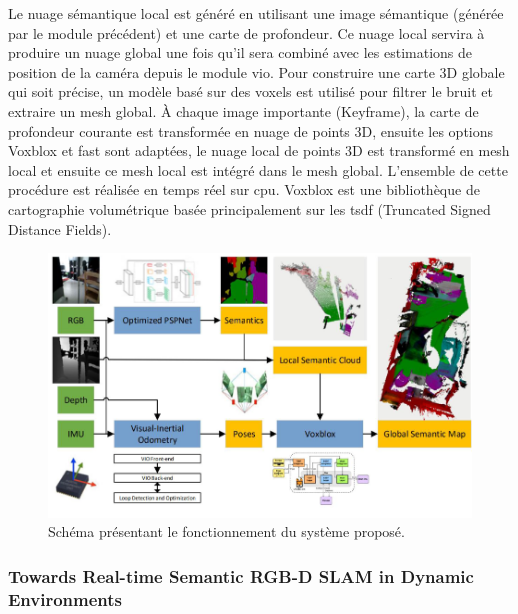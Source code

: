 \documentclass[11pt]{article}
\begin{document}
  Le nuage sémantique local est généré en utilisant une image sémantique (générée par le module précédent) et une carte de profondeur. 
  Ce nuage local servira à produire un nuage global une fois qu'il sera combiné avec les estimations de position de la caméra depuis le module \acrshort{vio}.
  Pour construire une carte 3D globale qui soit précise, un modèle basé sur des voxels est utilisé pour filtrer le bruit et extraire un mesh global.
  À chaque image importante (Keyframe), la carte de profondeur courante est transformée en nuage de points 3D, ensuite les options Voxblox et \acrshort{fast}
  sont adaptées, le nuage local de points 3D est transformé en mesh local et ensuite ce mesh local est intégré dans le mesh global. L'ensemble de 
  cette procédure est réalisée en temps réel sur \acrshort{cpu}. Voxblox est une bibliothèque de cartographie volumétrique basée principalement 
  sur les \acrshort{tsdf} (Truncated Signed Distance Fields).

  \begin{figure}[hbt]  
    \includegraphics[width=\textwidth]{PipelineP2.png}    
    \caption{Schéma présentant le fonctionnement du système proposé.}
    \label{fig:PipelineP2}
  \end{figure} 
  
  \pagebreak  

  \subsubsection{Towards Real-time Semantic RGB-D SLAM in Dynamic Environments} 
\end{document}
